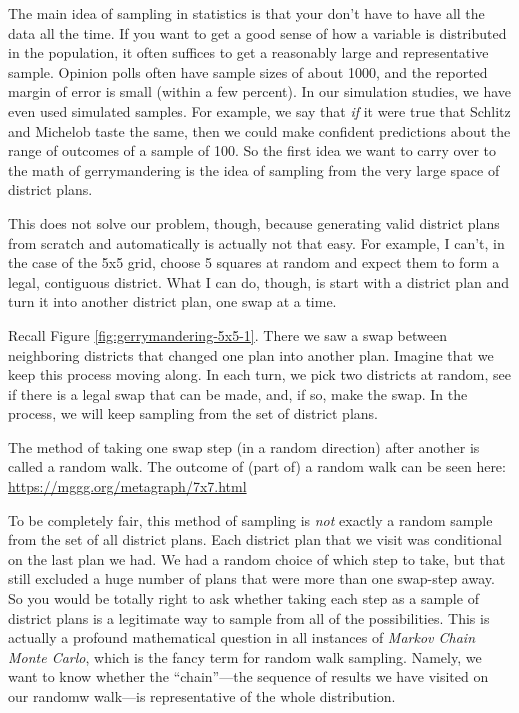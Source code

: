 \documentclass[
  openany]{book}
\begin{document}
The main idea of sampling in statistics is that your don't have to have all the data all the time. If you want to get a good sense of how a variable is distributed in the population, it often suffices to get a reasonably large and representative sample. Opinion polls often have sample sizes of about 1000, and the reported margin of error is small (within a few percent). In our simulation studies, we have even used simulated samples. For example, we say that \emph{if} it were true that Schlitz and Michelob taste the same, then we could make confident predictions about the range of outcomes of a sample of 100. So the first idea we want to carry over to the math of gerrymandering is the idea of sampling from the very large space of district plans.

This does not solve our problem, though, because generating valid district plans from scratch and automatically is actually not that easy. For example, I can't, in the case of the 5x5 grid, choose 5 squares at random and expect them to form a legal, contiguous district. What I can do, though, is start with a district plan and turn it into another district plan, one swap at a time.

Recall Figure \ref{fig:gerrymandering-5x5-1}. There we saw a swap between neighboring districts that changed one plan into another plan. Imagine that we keep this process moving along. In each turn, we pick two districts at random, see if there is a legal swap that can be made, and, if so, make the swap. In the process, we will keep sampling from the set of district plans.

The method of taking one swap step (in a random direction) after another is called a random walk. The outcome of (part of) a random walk can be seen here: \url{https://mggg.org/metagraph/7x7.html}

To be completely fair, this method of sampling is \emph{not} exactly a random sample from the set of all district plans. Each district plan that we visit was conditional on the last plan we had. We had a random choice of which step to take, but that still excluded a huge number of plans that were more than one swap-step away. So you would be totally right to ask whether taking each step as a sample of district plans is a legitimate way to sample from all of the possibilities. This is actually a profound mathematical question in all instances of \emph{Markov Chain Monte Carlo}, which is the fancy term for random walk sampling. Namely, we want to know whether the ``chain''---the sequence of results we have visited on our randomw walk---is representative of the whole distribution.
\end{document}
